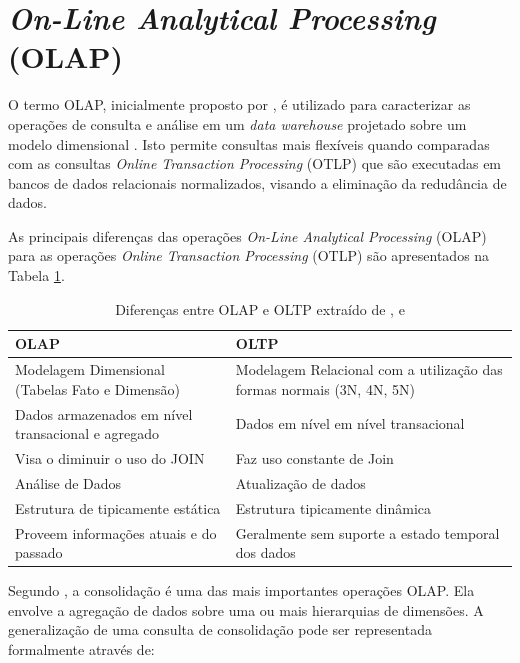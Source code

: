 \section{\textit{On-Line Analytical Processing} (OLAP)}

O termo OLAP, inicialmente proposto por , é utilizado para caracterizar as operações de consulta e análise em um \textit{data warehouse} projetado sobre um modelo dimensional \cite{Kimball2002}. Isto permite consultas mais flexíveis quando comparadas com as consultas \textit{Online Transaction Processing} (OTLP) que são executadas em bancos de dados relacionais normalizados, visando a eliminação da redudância de dados.

As principais diferenças das operações \textit{On-Line Analytical Processing} (OLAP) para as operações 
\textit{Online Transaction Processing} (OTLP) são apresentados na Tabela 
\ref{olapxoltp}.

	\begin{table}[!ht]
	\begin{center}
	 \begin{tabular}{|p{5cm}|p{5cm}|}
		\hline
		OLAP & OLTP \\ \hline
		Modelagem Dimensional (Tabelas Fato e Dimensão) & Modelagem Relacional com a utilização das formas normais (3N, 4N, 5N) \\ \hline
		Dados armazenados em nível transacional e agregado    & Dados em nível em nível transacional        \\ \hline
		Visa o diminuir o uso do JOIN & Faz uso constante de Join   \\ \hline
		Análise de Dados & Atualização de dados
		\\ \hline
		Estrutura de tipicamente estática  & Estrutura tipicamente dinâmica      \\ \hline
		Proveem informações atuais e do passado & Geralmente sem suporte a estado temporal dos dados
		      \\ \hline

		\end{tabular}
		\caption{Diferenças entre OLAP e OLTP extraído de ,  e }
		\label{olapxoltp}
		\end{center}
		\end{table}
		\FloatBarrier

Segundo , a consolidação é uma das mais importantes operações OLAP. Ela envolve a agregação de dados sobre uma ou mais hierarquias de dimensões. A generalização de uma consulta de consolidação pode ser representada formalmente através de: 

